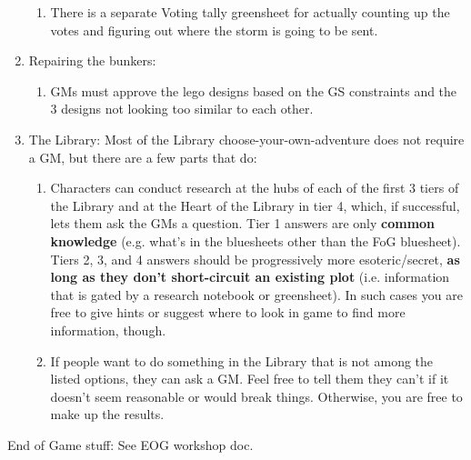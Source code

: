 \documentclass[green]{GL2020}
\begin{document}
\begin{enumerate}
\begin{enumerate}
		\item There is a separate Voting tally greensheet for actually counting up the votes and figuring out where the storm is going to be sent.
	\end{enumerate}
	\item Repairing the bunkers:
	\begin{enumerate}
		\item GMs must approve the lego designs based on the GS constraints and the 3 designs not looking too similar to each other.
	\end{enumerate}
	\item The Library: Most of the Library choose-your-own-adventure does not require a GM, but there are a few parts that do:
	\begin{enumerate}
		\item Characters can conduct research at the hubs of each of the first 3 tiers of the Library and at the Heart of the Library in tier 4, which, if successful, lets them ask the GMs a question. Tier 1 answers are only \textbf{common knowledge} (e.g. what’s in the bluesheets other than the FoG bluesheet). Tiers 2, 3, and 4 answers should be progressively more esoteric/secret, \textbf{as long as they don’t short-circuit an existing plot} (i.e. information that is gated by a research notebook or greensheet). In such cases you are free to give hints or suggest where to look in game to find more information, though.
		\item If people want to do something in the Library that is not among the listed options, they can ask a GM. Feel free to tell them they can’t if it doesn’t seem reasonable or would break things. Otherwise, you are free to make up the results.
	\end{enumerate}
\end{enumerate}

{\large End of Game stuff:}
See EOG workshop doc.
\end{document}
